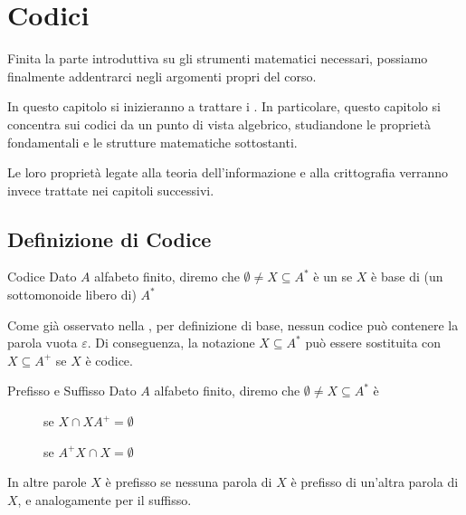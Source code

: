 \chapter{Codici}

Finita la parte introduttiva su gli strumenti matematici necessari,
possiamo finalmente addentrarci negli argomenti propri del corso.

In questo capitolo si inizieranno a trattare i .
In particolare, questo capitolo si concentra sui codici da un punto di vista algebrico, studiandone le proprietà fondamentali e le strutture matematiche sottostanti.

Le loro proprietà legate alla teoria dell'informazione e alla crittografia verranno invece trattate nei capitoli successivi.

\section{Definizione di Codice}
\begin{definition}{Codice}
  Dato \(A\) alfabeto finito, diremo che \(\emptyset \neq X \subseteq A^*\) è un  se \(X\) è base di (un sottomonoide libero di) \(A^*\)
\end{definition}

\begin{note}{}
  Come già osservato nella , per definizione di base, nessun codice può contenere la parola vuota \(\varepsilon\).
  Di conseguenza, la notazione \(X \subseteq A^*\) può essere sostituita con \(X \subseteq A^+\) se \(X\) è codice.
\end{note}

\begin{definition}[label=def:prefix_suffix]{Prefisso e Suffisso}
  Dato \(A\) alfabeto finito, diremo che \(\emptyset \neq X \subseteq A^*\) è
  \begin{description}
    \item[] se \(X\cap XA^+ = \emptyset\)
    \item[] se \(A^+X \cap X = \emptyset\)
  \end{description}
\end{definition}

In altre parole \(X\) è prefisso se nessuna parola di \(X\) è prefisso di un'altra parola di \(X\), e analogamente per il suffisso.

